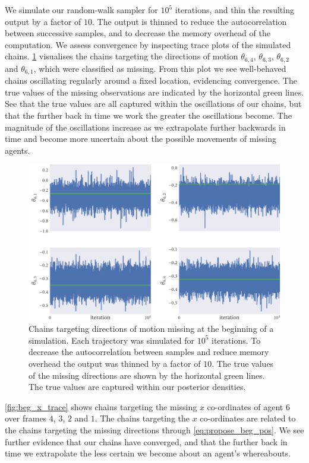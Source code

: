 We simulate our random-walk sampler for $10^5$ iterations, and thin the
resulting output by a factor of $10$. The output is thinned to reduce the
autocorrelation between successive samples, and to decrease the memory overhead
of the computation. We assess convergence by inspecting trace plots of the
simulated chains. \cref{fig:beg_dir_trace} visualises the chains targeting the
directions of motion $\theta_{6,4}$, $\theta_{6,3}$, $\theta_{6,2}$ and
$\theta_{6,1}$, which were classified as missing. From this plot we see
well-behaved chains oscillating regularly around a fixed location, evidencing
convergence. The true values of the missing observations are indicated by the
horizontal green lines. See that the true values are all captured within the
oscillations of our chains, but that the further back in time we work the
greater the oscillations become. The magnitude of the oscillations increase as
we extrapolate further backwards in time and become more uncertain about the
possible movements of missing agents.

\begin{figure}[tbp]
  \includegraphics{beg/dir_trace.pdf}
  \caption{Chains targeting directions of motion missing at the beginning of a
    simulation. Each trajectory was simulated for $10^5$ iterations. To
    decrease the autocorrelation between samples and reduce memory overhead
    the output was thinned by a factor of $10$. The true values of the
    missing directions are shown by the horizontal green lines. The true
    values are captured within our posterior densities.}
  \label{fig:beg_dir_trace}
\end{figure}

\cref{fig:beg_x_trace} shows chains targeting the missing $x$ co-ordinates of
agent $6$ over frames $4$, $3$, $2$ and $1$. The chains targeting the $x$
co-ordinates are related to the chains targeting the missing directions through
\cref{eq:propose_beg_pos}. We see further evidence that our chains have
converged, and that the further back in time we extrapolate the less certain we
become about an agent's whereabouts.

